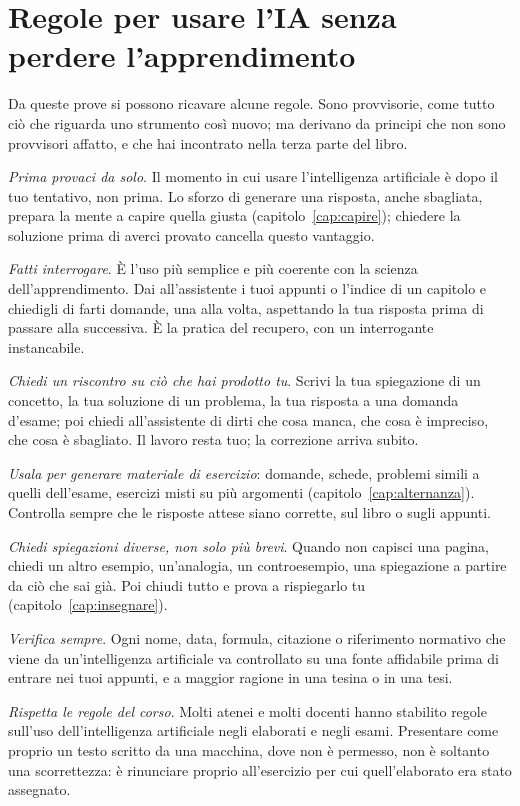 \section{Regole per usare l'IA senza perdere l'apprendimento}

Da queste prove si possono ricavare alcune regole. Sono provvisorie,
come tutto ciò che riguarda uno strumento così nuovo; ma derivano da
principi che non sono provvisori affatto, e che hai incontrato nella
terza parte del libro.

\emph{Prima provaci da solo}. Il momento in cui usare l'intelligenza
artificiale è dopo il tuo tentativo, non prima. Lo sforzo di generare
una risposta, anche sbagliata, prepara la mente a capire quella giusta
(capitolo~\ref{cap:capire}); chiedere la soluzione prima di averci
provato cancella questo vantaggio.

\emph{Fatti interrogare}. È l'uso più semplice e più coerente con la
scienza dell'apprendimento. Dai all'assistente i tuoi appunti o
l'indice di un capitolo e chiedigli di farti domande, una alla volta,
aspettando la tua risposta prima di passare alla successiva. È la
pratica del recupero, con un interrogante instancabile.

\emph{Chiedi un riscontro su ciò che hai prodotto tu}. Scrivi la tua
spiegazione di un concetto, la tua soluzione di un problema, la tua
risposta a una domanda d'esame; poi chiedi all'assistente di dirti che
cosa manca, che cosa è impreciso, che cosa è sbagliato. Il lavoro resta
tuo; la correzione arriva subito.

\emph{Usala per generare materiale di esercizio}: domande, schede,
problemi simili a quelli dell'esame, esercizi misti su più argomenti
(capitolo~\ref{cap:alternanza}). Controlla sempre che le risposte
attese siano corrette, sul libro o sugli appunti.

\emph{Chiedi spiegazioni diverse, non solo più brevi}. Quando non capisci
una pagina, chiedi un altro esempio, un'analogia, un controesempio,
una spiegazione a partire da ciò che sai già. Poi chiudi tutto e prova a
rispiegarlo tu (capitolo~\ref{cap:insegnare}).

\emph{Verifica sempre}. Ogni nome, data, formula, citazione o
riferimento normativo che viene da un'intelligenza artificiale va
controllato su una fonte affidabile prima di entrare nei tuoi appunti,
e a maggior ragione in una tesina o in una tesi.

\emph{Rispetta le regole del corso}. Molti atenei e molti docenti hanno
stabilito regole sull'uso dell'intelligenza artificiale negli
elaborati e negli esami. Presentare come proprio un testo scritto da
una macchina, dove non è permesso, non è soltanto una scorrettezza: è
rinunciare proprio all'esercizio per cui quell'elaborato era stato
assegnato.

